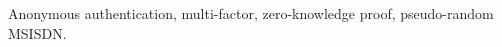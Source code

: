 \documentclass[lettersize,journal]{IEEEtran}
\begin{document}
\begin{IEEEkeywords}
Anonymous authentication, multi-factor, zero-knowledge proof, pseudo-random MSISDN.
\end{IEEEkeywords}



%








%
%
%
%
%
%
%
%
%
%
%
%
\end{document}
